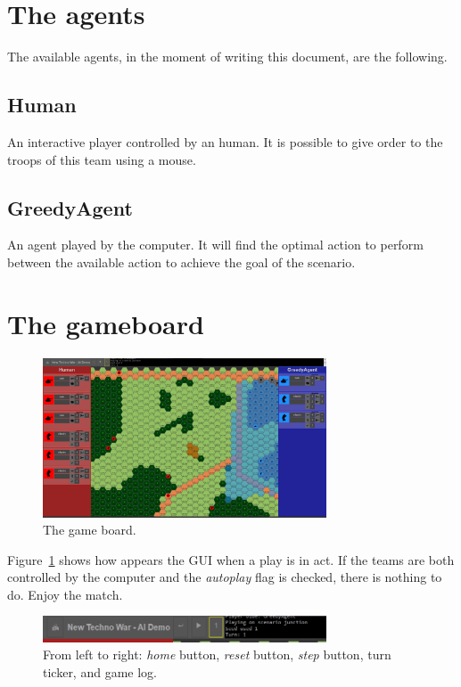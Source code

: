 \documentclass[a4paper]{article}
\begin{document}
	\section{The agents}

	The available agents, in the moment of writing this document, are the following.

	\subsection{Human}
	An interactive player controlled by an human. It is possible to give order to the troops of this team using a mouse.

	\subsection{GreedyAgent}
	An agent played by the computer. It will find the optimal action to perform between the available action to achieve the goal of the scenario.

	
	\section{The gameboard}

	\begin{figure}[ht!]
		\centering
		\includegraphics[width=0.75\textwidth]{game.png}
		\caption{The game board.}
		\label{game}
	\end{figure}

	Figure~\ref{game} shows how appears the GUI when a play is in act. If the teams are both controlled by the computer and the \textit{autoplay} flag is checked, there is nothing to do. Enjoy the match.

	\begin{figure}[ht!]
		\centering
		\includegraphics[width=0.75\textwidth]{controls.png}
		\caption{From left to right: \textit{home} button, \textit{reset} button, \textit{step} button, turn ticker, and game log.}
		\label{controls}
	\end{figure}
\end{document}
